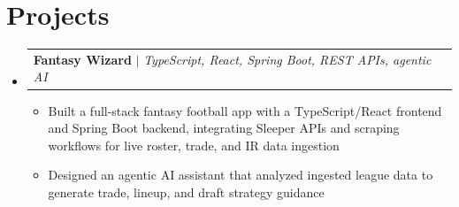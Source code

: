\documentclass[letterpaper,11pt]{article}
\makeatletter
\newcommand{\resumeItem}[1]{
  \item\small{
    {#1 \vspace{-1pt}}
  }
}
\newcommand{\resumeProjectHeading}[2]{
    \item
    \begin{tabular*}{0.97\textwidth}{l@{\extracolsep{\fill}}r}
      \small#1 & #2 \\
    \end{tabular*}\vspace{-7pt}
}
\newcommand{\resumeSubHeadingListStart}{\begin{itemize}[leftmargin=0.15in, label={}]}
\newcommand{\resumeSubHeadingListEnd}{\end{itemize}}
\newcommand{\resumeItemListStart}{\begin{itemize}[leftmargin=0.18in,itemsep=1pt,topsep=2pt]}
\newcommand{\resumeItemListEnd}{\end{itemize}\vspace{-5pt}}
\makeatother
\begin{document}
%
\section{Projects}
    \resumeSubHeadingListStart
      \resumeProjectHeading
          {\textbf{Fantasy Wizard} $|$ \emph{TypeScript, React, Spring Boot, REST APIs, agentic AI}}{}
          \resumeItemListStart
            \resumeItem{Built a full-stack fantasy football app with a TypeScript/React frontend and Spring Boot backend, integrating Sleeper APIs and scraping workflows for live roster, trade, and IR data ingestion}
            \resumeItem{Designed an agentic AI assistant that analyzed ingested league data to generate trade, lineup, and draft strategy guidance}
          \resumeItemListEnd
    \resumeSubHeadingListEnd

\end{document}
